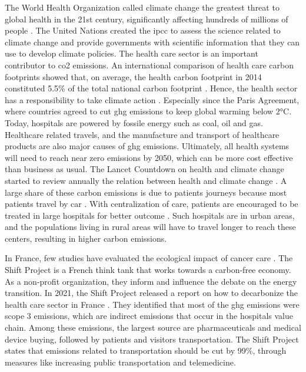 The World Health Organization called climate change the greatest threat to
global health in the 21st century, significantly affecting hundreds of millions
of people \cite{change_climate_2015}. The United Nations created the \ac{ipcc}
to assess the science related to climate change and provide governments with
scientific information that they can use to develop climate policies. The health
care sector is an important contributor to \ac{co2} emissions. An international
comparison of health care carbon footprints showed that, on average, the health
carbon footprint in 2014 constituted 5.5\% of the total national carbon
footprint \cite{pichler_international_2019}. Hence, the health sector has a
responsibility to take climate action
\cite{health_care_without_harm_hcwh_global_2021}. Especially since the Paris
Agreement, where countries agreed to cut \ac{ghg} emissions to keep global
warming below 2°C. Today, hospitals are powered by fossile energy such as coal,
oil and gas. Healthcare related travels, and the manufacture and transport of
healthcare products are also major causes of \ac{ghg} emissions. Ultimately, all
health systems will need to reach near zero emissions by 2050, which can be more
cost effective than business as usual. The Lancet Countdown on health and
climate change started to review annually the relation between health and
climate change \cite{watts_2020_2021}. A large share of these carbon emissions
is due to patients journeys \cite{andrews_carbon_2013,nicolet_what_2022} because
most patients travel by car \cite{forner_carbon_2021}. With centralization of
care, patients are encouraged to be treated in large hospitals for better
outcome \cite{eskander_health_2016}. Such hospitals are in urban areas, and the
populations living in rural areas will have to travel longer to reach these
centers, resulting in higher carbon emissions.

In France, few studies have evaluated the ecological impact of cancer care
\cite{guillon_empreinte_2020}. The Shift Project is a French think tank that
works towards a carbon-free economy. As a non-profit organization, they inform
and influence the debate on the energy transition. In 2021, the Shift Project
released a report on how to decarbonize the health care sector in France
\cite{the_shift_project_plan_2021}. They identified that most of the \ac{ghg}
emissions were scope 3 emissions, which are indirect emissions that occur in the
hospitals value chain. Among these emissions, the largest source are
pharmaceuticals and medical device buying, followed by patients and visitors
transportation. The Shift Project states that emissions related to
transportation should be cut by 99\%, through measures like increasing public
transportation and telemedicine.

